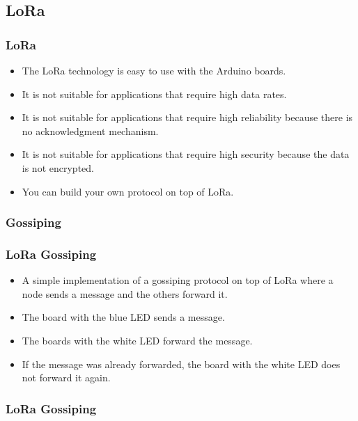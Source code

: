 \documentclass{beamer}
\begin{document}
\subsection{LoRa}
\begin{frame}
    \frametitle{LoRa}
    \begin{itemize}[<+->]
        \item The LoRa technology is easy to use with the Arduino boards.
        \item It is not suitable for applications that require high data rates.
        \item It is not suitable for applications that require high reliability because there
              is no acknowledgment mechanism.
        \item It is not suitable for applications that require high security because the data
              is not encrypted.
        \item You can build your own protocol on top of LoRa.
    \end{itemize}
\end{frame}

\subsubsection{Gossiping}
\begin{frame}
    \frametitle{LoRa Gossiping}

    \begin{itemize}[<+->]
        \item A simple implementation of a gossiping protocol on top of LoRa where a node
              sends a message and the others forward it.
        \item The board with the blue LED sends a message.
        \item The boards with the white LED forward the message.
        \item If the message was already forwarded, the board with the white LED does not
              forward it again.
    \end{itemize}
\end{frame}

\begin{frame}
    \frametitle{LoRa Gossiping}
    \begin{center}
        \href{https://raw.githubusercontent.com/iotresearchunisa/lora-lorawan/refs/heads/main/Presentation/videos/lora_gossiping.mp4}{}
    \end{center}
\end{frame}
\end{document}
